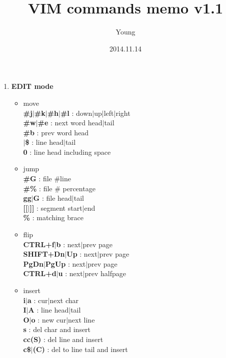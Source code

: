 \documentclass[10pt, a4paper]{article}
\begin{document}
\twocolumn

\pagestyle{empty}
\title{VIM commands memo v1.1}
\author{Young}
\date{2014.11.14}
\maketitle
\thispagestyle{empty} %

\setlength{\baselineskip}{12pt} %

\begin{enumerate}
\item{\textbf{EDIT mode}}
    \begin{itemize}
    \item move \\
    \textbf{\#j{$|$}\#k{$|$}\#h{$|$}\#l} : down{$|$}up{$|$}left{$|$}right \\
    \textbf{\#w{$|$}\#e} : next word head{$|$}tail \\
    \textbf{\#b} : prev word head \\
    \textbf{\^{$|$}\$} : line head{$|$}tail \\
    \textbf{0} : line head including space
    \item jump \\
    \textbf{\#G} : file \#line \\
    \textbf{\#\%} : file \# percentage \\
    \textbf{gg{$|$}G} : file head{$|$}tail \\
    \textbf{[[{$|$}]]} : segment start{$|$}end \\
    \textbf{\%} : matching brace
    \item flip \\
    \textbf{CTRL+f{$|$}b} : next{$|$}prev page \\
    \textbf{SHIFT+Dn{$|$}Up} : next{$|$}prev page \\
    \textbf{PgDn{$|$}PgUp} : next{$|$}prev page \\
    \textbf{CTRL+d{$|$}u} : next{$|$}prev halfpage
    \item insert \\
    \textbf{i{$|$}a} : cur{$|$}next char \\
    \textbf{I{$|$}A} : line head{$|$}tail \\
    \textbf{O{$|$}o} : new cur{$|$}next line \\
    \textbf{s} : del char and insert \\
    \textbf{cc(S)} : del line and insert \\
    \textbf{c\${$|$}(C)} : del to line tail and insert

\end{itemize}
\end{enumerate}
\end{document}
